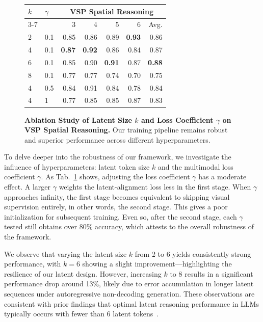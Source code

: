 \begin{figure}
    \centering
    \caption{\textbf{Ablation Study of Latent Size $k$ and Loss Coefficient $\gamma$ on VSP Spatial Reasoning.} Our training pipeline remains robust and superior performance across different hyperparameters.}
    \begin{tabular}{llrrrrr}
        \toprule
        \multirow{2}{*}{$k$} & \multirow{2}{*}{$\gamma$} &\multicolumn{5}{c}{\textbf{VSP Spatial Reasoning}} \\
        \cmidrule(lr){3-7}
        & & 3 & 4 & 5 & 6 & Avg. \\
        \midrule
        2 & 0.1 & 0.85 & 0.86 & 0.89 & \textbf{0.93} & 0.86 \\
        4 & 0.1 & \textbf{0.87} & \textbf{0.92} & 0.86 & 0.84 & 0.87  \\
        6 & 0.1 & 0.85 & 0.90 & \textbf{0.91} & 0.87 & \textbf{0.88} \\
        8 & 0.1 & 0.77 & 0.77 & 0.74 & 0.70 & 0.75 \\
        4 & 0.5 & 0.84 & 0.91 & 0.84 & 0.78 & 0.84 \\
        4 & 1 & 0.77 & 0.85 & 0.85 & 0.87 & 0.83 \\
        \bottomrule
    \end{tabular}
    \label{tab:main-ablation-latent}
\end{figure}

To delve deeper into the robustness of our framework, we investigate the influence of hyperparameters: latent token size $k$ and the multimodal loss coefficient $\gamma$. 
As Tab.~\ref{tab:main-ablation-latent} shows, adjusting the loss coefficient $\gamma$ has a moderate effect. 
A larger $\gamma$ weights the latent-alignment loss less in the first stage.
When $\gamma$ approaches infinity, the first stage becomes equivalent to skipping visual supervision entirely, in other words, the second stage. This gives a poor initialization for subsequent training.
Even so, after the second stage, each $\gamma$ tested still obtains over 80\% accuracy, which attests to the overall robustness of the framework.


We observe that varying the latent size $k$ from 2 to 6 yields consistently strong performance, with $k=6$ showing a slight improvement—highlighting the resilience of our latent design. However, increasing $k$ to 8 results in a significant performance drop around 13\%, likely due to error accumulation in longer latent sequences under autoregressive non-decoding generation. These observations are consistent with prior findings that optimal latent reasoning performance in LLMs typically occurs with fewer than 6 latent tokens~\citep{hao2024training}.
